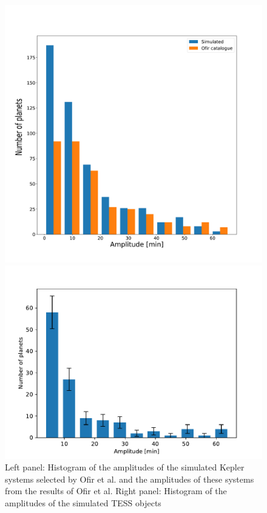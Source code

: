 \documentclass[12pt]{report}
\begin{document}
\begin{figure}
\centering
\begin{minipage}{.5\textwidth}
  \centering
  \includegraphics[width=0.9\linewidth]{img/histo_amp_both2.pdf}
  
 

\end{minipage}%
\begin{minipage}{.5\textwidth}
  \centering
  \includegraphics[width=1\linewidth]{img/ampl.pdf}
  

\end{minipage}
\caption{Left panel: Histogram of the amplitudes of the simulated Kepler systems selected by Ofir et al. and the amplitudes of these systems from the results of Ofir et al. Right panel: Histogram of the amplitudes of the simulated TESS objects}
\label{fig:ampl_ofir}
\end{figure}
\end{document}
